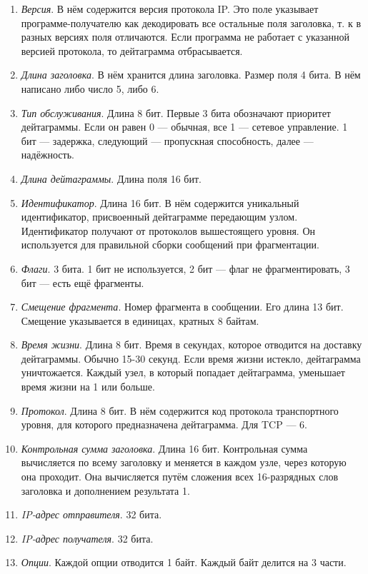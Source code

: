 \documentclass[12pt, russian, oneside, article]{ncc}
\begin{document}
\begin{enumerate}
\item \emph{Версия}. В нём содержится версия протокола IP. Это поле указывает программе-получателю как декодировать все остальные поля заголовка, т. к в разных версиях поля отличаются. Если программа не работает с указанной версией протокола, то дейтаграмма отбрасывается.
\item \emph{Длина заголовка}. В нём хранится длина заголовка. Размер поля 4 бита. В нём написано либо число 5, либо 6.
\item \emph{Тип обслуживания}. Длина 8 бит. Первые 3 бита обозначают приоритет дейтаграммы. Если он равен 0 --- обычная, все 1 --- сетевое управление. 1 бит --- задержка, следующий --- пропускная способность, далее --- надёжность.
\item \emph{Длина дейтаграммы}. Длина поля 16 бит.
\item \emph{Идентификатор}. Длина 16 бит. В нём содержится уникальный идентификатор, присвоенный дейтаграмме передающим узлом. Идентификатор получают от протоколов вышестоящего уровня. Он используется для правильной сборки сообщений при фрагментации.
\item \emph{Флаги}. 3 бита. 1 бит не используется, 2 бит --- флаг не фрагментировать, 3 бит --- есть ещё фрагменты.
\item \emph{Смещение фрагмента}. Номер фрагмента в сообщении. Его длина 13 бит. Смещение указывается в единицах, кратных 8 байтам.
\item \emph{Время жизни}. Длина 8 бит. Время в секундах, которое отводится на доставку дейтаграммы. Обычно 15-30 секунд. Если время жизни истекло, дейтаграмма уничтожается. Каждый узел, в который попадает дейтаграмма, уменьшает время жизни на 1 или больше.
\item \emph{Протокол}. Длина 8 бит. В нём содержится код протокола транспортного уровня, для которого предназначена дейтаграмма. Для TCP --- 6.
\item \emph{Контрольная сумма заголовка}. Длина 16 бит. Контрольная сумма вычисляется по всему заголовку и меняется в каждом узле, через которую она проходит. Она вычисляется путём сложения всех 16-разрядных слов заголовка и дополнением результата 1.
\item \emph{IP-адрес отправителя}. 32 бита.
\item \emph{IP-адрес получателя}. 32 бита.
\item \emph{Опции}. Каждой опции отводится 1 байт. Каждый байт делится на 3 части.


\end{enumerate}
\end{document}
